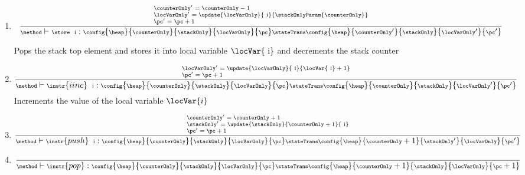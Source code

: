 \begin{itemize}
\begin{enumerate}
        \item \store
        $$ {\scriptsize \frac{  \begin{array}{l}
	                \counterOnly' = \counterOnly- 1\\
			\locVarOnly' =	\update{\locVarOnly}{ \mbox{ \rm i} } { \stackOnlyParam{\counterOnly}} \\
			\pc' = \pc + 1
	          \end{array} }
                {\method \vdash  \store \ \mbox{ \rm i} :  \config{\heap}{\counterOnly}{\stackOnly}{\locVarOnly}{\pc} 
		  \stateTrans 
                  \config{\heap}{\counterOnly'}{\stackOnly }{\locVarOnly' }{\pc'} } } $$ 

	     Pops the stack top element \stackOnlyParam{\counterOnly}  and stores it into local variable $\locVar{\mbox{ \rm i}}$ and  decrements the stack counter 
	     \counterOnly  
	
        \item  {}

                $${\scriptsize  \frac{ \begin{array}{l}	               
			\locVarOnly' =  \update{\locVarOnly}{\mbox{ \rm i} }{ \locVar{\mbox{ \rm i} } + 1}\\
			\pc' = \pc + 1
	          \end{array} } 
	        {\method \vdash \instr{iinc } \ \mbox{ \rm i}  :  \config{\heap}{\counterOnly}{\stackOnly}{\locVarOnly}{\pc} 
		  \stateTrans 
                  \config{\heap}{\counterOnly}{\stackOnly}{\locVarOnly' }{\pc'}  }  } $$ 
            Increments the value of the local variable $\locVar{i}$ 
	
	\item \push
	       $${\scriptsize \frac{\begin{array}{l}
	                \counterOnly' = \counterOnly + 1\\
			\stackOnly' = \update{\stackOnly}{\counterOnly +  1}{\mbox{ \rm i}  }\\
			\pc' = \pc + 1
	          \end{array}  } 
	        {\method \vdash \instr{push} \ \mbox{ \rm i}  :  \config{\heap}{\counterOnly}{\stackOnly}{\locVarOnly}{\pc} 
		                                  \stateTrans  
						  \config{\heap}{\counterOnly + 1}{\stackOnly' }
						  {\locVarOnly}
						  {\pc'}  } } $$
     
      \item {} 
       $${\scriptsize \frac{ } 
	        {\method \vdash \instr{pop}   :  \config{\heap}{\counterOnly}{\stackOnly}{\locVarOnly}{\pc} 
		                                  \stateTrans  
						  \config{\heap}{\counterOnly + 1}{\stackOnly}
						  {\locVarOnly}
						  {\pc + 1}  } } $$
    \end{enumerate}



\end{itemize}
